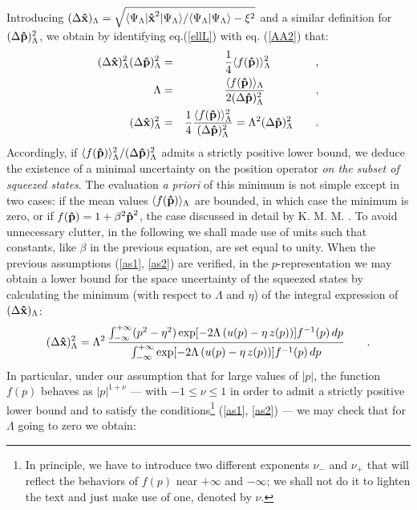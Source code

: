 \documentclass[a4paper,10pt]{article}
\newcommand{\x}{\mbox{\rm{\bf \^ x}}}
\newcommand{\p}{\mbox{\rm{\bf \^ p}}}
\newcommand{\KMM}{K. M. M. }
\begin{document}
Introducing $(\Delta
\x)_\Lambda=\sqrt{\langle\Psi_\Lambda|\x^2|\Psi_\Lambda\rangle/\langle\Psi_\Lambda|\Psi_\Lambda\rangle
- \xi^2}$ and a similar definition for $(\Delta \p)^2_\Lambda$, we
obtain by identifying eq.(\ref{ellL}) with eq. (\ref{AA2}) that:
\begin{eqnarray}
(\Delta\x)_\Lambda^2(\Delta\p)_\Lambda^2 &=&\frac
14\langle f(\p)\rangle_\Lambda^2\qquad\qquad ,\\
\Lambda &=& \frac{\langle
f(\p)\rangle_\Lambda}{2(\Delta\p)_\Lambda^2}\qquad\ \,\qquad,\\
(\Delta\x)_\Lambda^2&=&\frac 14 \frac{\langle
f(\p)\rangle_\Lambda^2}{(\Delta\p)_\Lambda^2}
=\Lambda^2(\Delta\p)_\Lambda^2\qquad .
\end{eqnarray}
Accordingly, if ${\langle
f(\p)\rangle_\Lambda^2}/{(\Delta\p)_\Lambda^2}$ admits a strictly
positive lower bound, we deduce the existence of a minimal
uncertainty on the position operator {\it on the subset of
squeezed states}. The evaluation {\it a priori} of this minimum is
not simple except in two cases: if the mean values $\langle
f(\p)\rangle_\Lambda$ are bounded, in which case the minimum is
zero, or if $f(\p) = 1+ \beta^2\p^2$, the case discussed in detail
by \KMM \cite{K2}. To avoid unnecessary clutter, in the following
we shall made use of units such that constants, like $\beta$ in
the previous equation, are set equal to unity. When the previous
assumptions (\ref{as1}, \ref{as2}) are verified, in the
$p$-representation we may obtain a lower bound for the space
uncertainty of the squeezed states by calculating the minimum
(with respect to $\Lambda$ and $\eta$) of the integral expression
of $(\Delta \x)_{\Lambda}$:
\begin{equation} (\Delta
\x)^2_{\Lambda}=\Lambda^2\,\frac{\int_{-\infty}^{+\infty}(p^2-\eta^2)\exp[-2\Lambda
\,(u(p)-\eta\,z(p))]f^{-1}(p)\,dp}{\int_{-\infty}^{+\infty}\exp[-2\Lambda
\,(u(p)-\eta\,z(p))]f^{-1}(p)\,dp}\label{dxLdp}\qquad .
\end{equation}
In particular, under our assumption that for large values of
$\vert p \vert$, the function $f(p)$ behaves as $\vert
p\vert^{1+\nu}$ --- with $-1\leq\nu\leq 1$ in order to admit a
strictly positive lower bound and to satisfy the
conditions\footnote{In principle, we have to introduce two
different exponents $\nu_-$ and $\nu_+$ that will reflect the
behaviors of $f(p)$ near $+\infty$ and $-\infty$; we shall not do
it to lighten the text and just make use of one, denoted by
$\nu$.} (\ref{as1}, \ref{as2}) --- we may check that for $\Lambda$
going to zero we obtain:
\end{document}
